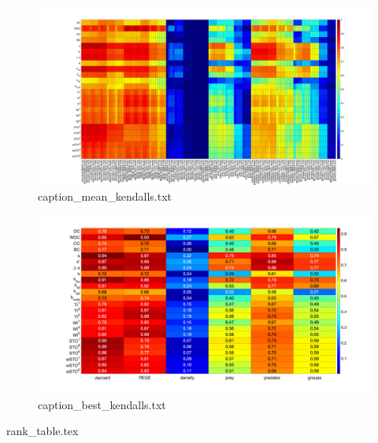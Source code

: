 \documentclass[onecolumn]{article} %
\begin{document}
						\begin{figure}[htbp]%
							\centering
							\includegraphics[width=1.0\linewidth]{mean_kendalls_a.png}
							\caption{ {caption_mean_kendalls.txt} }
							\label{fig:equivalences}
						\end{figure} %

						\begin{figure}[htbp]%
							\centering
							\includegraphics[width=1.0\linewidth]{best_kendalls.png}
							\caption{ {caption_best_kendalls.txt} }
							\label{fig:equivalences}
						\end{figure} %

						{rank_table.tex}
\end{document}
